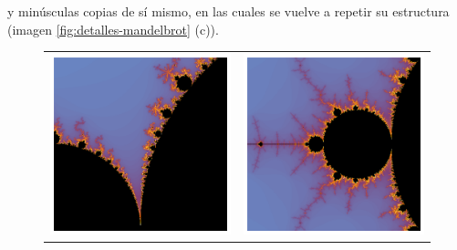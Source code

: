 y minúsculas copias de sí mismo, en las cuales se vuelve a repetir su estructura (imagen \ref{fig:detalles-mandelbrot} (c)).

\begin{figure}[ht]
  \centering
  \begin{tabular}{cc}
    \includegraphics[scale=0.35]{./img/C3/mandelbrot-autosimilar-1.png} &   \includegraphics[scale=0.35]{./img/C3/mandelbrot-autosimilar-2.png} \\

\end{tabular}
\end{figure}
